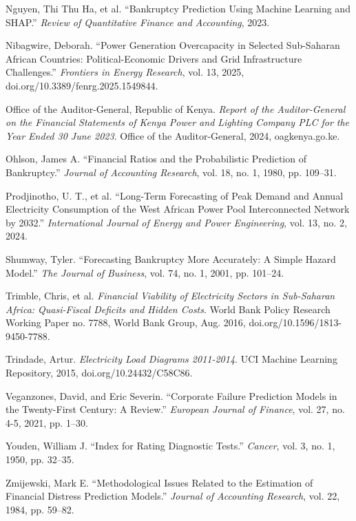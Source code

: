 \documentclass[final,1p,times]{elsarticle}
\begin{document}
\begin{list}{}{\setlength{\leftmargin}{0.5in}\setlength{\itemindent}{-0.5in}\setlength{\itemsep}{10pt}\setlength{\parsep}{0pt}}
\item Nguyen, Thi Thu Ha, et al. ``Bankruptcy Prediction Using Machine Learning and SHAP.'' \textit{Review of Quantitative Finance and Accounting}, 2023.

\item Nibagwire, Deborah. ``Power Generation Overcapacity in Selected Sub-Saharan African Countries: Political-Economic Drivers and Grid Infrastructure Challenges.'' \textit{Frontiers in Energy Research}, vol. 13, 2025, doi.org/10.3389/fenrg.2025.1549844.

\item Office of the Auditor-General, Republic of Kenya. \textit{Report of the Auditor-General on the Financial Statements of Kenya Power and Lighting Company PLC for the Year Ended 30 June 2023}. Office of the Auditor-General, 2024, oagkenya.go.ke.

\item Ohlson, James A. ``Financial Ratios and the Probabilistic Prediction of Bankruptcy.'' \textit{Journal of Accounting Research}, vol. 18, no. 1, 1980, pp. 109--31.

\item Prodjinotho, U. T., et al. ``Long-Term Forecasting of Peak Demand and Annual Electricity Consumption of the West African Power Pool Interconnected Network by 2032.'' \textit{International Journal of Energy and Power Engineering}, vol. 13, no. 2, 2024.

\item Shumway, Tyler. ``Forecasting Bankruptcy More Accurately: A Simple Hazard Model.'' \textit{The Journal of Business}, vol. 74, no. 1, 2001, pp. 101--24.

\item Trimble, Chris, et al. \textit{Financial Viability of Electricity Sectors in Sub-Saharan Africa: Quasi-Fiscal Deficits and Hidden Costs}. World Bank Policy Research Working Paper no. 7788, World Bank Group, Aug. 2016, doi.org/10.1596/1813-9450-7788.

\item Trindade, Artur. \textit{Electricity Load Diagrams 2011-2014}. UCI Machine Learning Repository, 2015, doi.org/10.24432/C58C86.

\item Veganzones, David, and Eric Severin. ``Corporate Failure Prediction Models in the Twenty-First Century: A Review.'' \textit{European Journal of Finance}, vol. 27, no. 4-5, 2021, pp. 1--30.

\item Youden, William J. ``Index for Rating Diagnostic Tests.'' \textit{Cancer}, vol. 3, no. 1, 1950, pp. 32--35.

\item Zmijewski, Mark E. ``Methodological Issues Related to the Estimation of Financial Distress Prediction Models.'' \textit{Journal of Accounting Research}, vol. 22, 1984, pp. 59--82.

\end{list}
\end{document}
